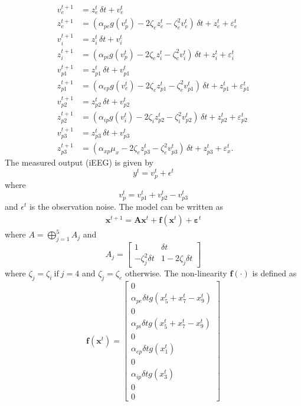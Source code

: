 \documentclass[]{article}
\begin{document}
\begin{align}
	v_e^{t+1} &= z_e^{t}\,\delta t + v_e^{t}\\
	z_e^{t+1} &= (\alpha_{pe}g\left(v_p^{t}\right) - 2\zeta_{e}z_e^{t} - \zeta_{e}^2v_e^{t})\,\delta t + z_e^{t} + \varepsilon_e^{t} \\
	v_i^{t+1} &= z_i^{t}\,\delta t + v_i^{t}\\
	z_i^{t+1} &= \left(\alpha_{pi}g\left(v_p^{t}\right) - 2\zeta_{e}z_i^{t} - \zeta_{e}^2v_i^{t}\right)\,\delta t + z_i^{t} + \varepsilon_i^{t}\\
	v_{p1}^{t+1} &= z_{p1}^{t}\,\delta t + v_{p1}^{t} \\
	z_{p1}^{t+1} &= (\alpha_{ep}g\left(v_e^{t}\right) - 2\zeta_{e}z_{p1}^{t}- \zeta_{e}^2v_{p1}^{t})\,\delta t + z_{p1}^{t} + \varepsilon_{p1}^{t}\\
	v_{p2}^{t+1} &= z_{p2}^{t}\,\delta t + v_{p2}^{t} \\
	z_{p2}^{t+1} &= (\alpha_{ip}g\left(v_i^{t}\right) - 2\zeta_{i}z_{p2}^{t} - \zeta_{i}^2v_{p2}^{t})\,\delta t + z_{p2}^{t} + \varepsilon_{p2}^{t} \\
	v_{p3}^{t+1} &= z_{p3}^{t}\,\delta t + v_{p3}^{t} \\
	z_{p3}^{t+1} &= (\alpha_{xp}\mu_x - 2\zeta_{e}z_{p3}^{t} - \zeta_{e}^2v_{p3}^{t})\,\delta t + z_{p3}^{t} + \varepsilon_x^{t}.
\end{align} 
The measured output (iEEG) is given by
\begin{equation}
 y^{t}=v_p^{t}+\epsilon^{t}
\end{equation}
where
\begin{equation}
 v_p^{t}=v_{p1}^{t}+v_{p2}^{t}-v_{p3}^{t}  
	\end{equation}  
and $\epsilon^{t}$ is the observation noise.
The model can be written as
\begin{align}
	\mathbf{x}^{t+1} = \mathbf{A}\mathbf{x}^t + \mathbf{f}(\mathbf{x}^t) + \boldsymbol{\varepsilon}^t
\end{align} 
where $A=\bigoplus_{j=1}^5A_j$
and
\begin{equation}
	A_j=\begin{bmatrix}1&\delta t\\-\zeta_j^2\delta t&1-2\zeta_j\delta t\end{bmatrix}
\end{equation} 
where $\zeta_j=\zeta_i~\text{if}~j=4$ and $\zeta_j=\zeta_e$ otherwise. The non-linearity $\mathbf f(\cdot)$ is defined as
\begin{equation}
 \mathbf{f}(\mathbf{x}^t)= \begin{bmatrix}0\\ \alpha_{pe}\delta t g\left(x_{5}^{t}+x_{7}^{t}-x_{9}^{t}\right)\\0\\\alpha_{pi}\delta t g\left(x_{5}^{t}+x_{7}^{t}-x_{9}^{t}\right)\\0\\\alpha_{ep}\delta t g\left(x_1^{t}\right)\\0\\\alpha_{ip}\delta t g\left(x_3^{t}\right)\\0\\0\end{bmatrix}
\end{equation}
\end{document}

